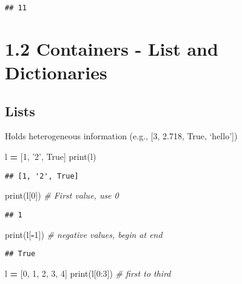 \documentclass[]{book}
\newenvironment{Shaded}{\begin{snugshade}}{\end{snugshade}}
\newcommand{\BuiltInTok}[1]{#1}
\newcommand{\CommentTok}[1]{\textcolor[rgb]{0.56,0.35,0.01}{\textit{#1}}}
\newcommand{\DecValTok}[1]{\textcolor[rgb]{0.00,0.00,0.81}{#1}}
\newcommand{\NormalTok}[1]{#1}
\newcommand{\OperatorTok}[1]{\textcolor[rgb]{0.81,0.36,0.00}{\textbf{#1}}}
\newcommand{\StringTok}[1]{\textcolor[rgb]{0.31,0.60,0.02}{#1}}
\newcommand{\VariableTok}[1]{\textcolor[rgb]{0.00,0.00,0.00}{#1}}
\theoremstyle{definition}
\theoremstyle{definition}
\theoremstyle{definition}
\theoremstyle{remark}
\begin{document}
\begin{verbatim}
## 11
\end{verbatim}

\hypertarget{containers---list-and-dictionaries}{%
\section{1.2 Containers - List and
Dictionaries}\label{containers---list-and-dictionaries}}

\hypertarget{lists}{%
\subsection{Lists}\label{lists}}

Holds heterogeneous information (e.g., {[}3, 2.718, True, `hello'{]})

\begin{Shaded}
\begin{Highlighting}[]
\NormalTok{l }\OperatorTok{=}\NormalTok{ [}\DecValTok{1}\NormalTok{, }\StringTok{'2'}\NormalTok{, }\VariableTok{True}\NormalTok{]}
\BuiltInTok{print}\NormalTok{(l)}
\end{Highlighting}
\end{Shaded}

\begin{verbatim}
## [1, '2', True]
\end{verbatim}

\begin{Shaded}
\begin{Highlighting}[]
\BuiltInTok{print}\NormalTok{(l[}\DecValTok{0}\NormalTok{]) }\CommentTok{# First value, use 0}
\end{Highlighting}
\end{Shaded}

\begin{verbatim}
## 1
\end{verbatim}

\begin{Shaded}
\begin{Highlighting}[]
\BuiltInTok{print}\NormalTok{(l[}\OperatorTok{-}\DecValTok{1}\NormalTok{]) }\CommentTok{# negative values, begin at end}
\end{Highlighting}
\end{Shaded}

\begin{verbatim}
## True
\end{verbatim}

\begin{Shaded}
\begin{Highlighting}[]
\NormalTok{l }\OperatorTok{=}\NormalTok{ [}\DecValTok{0}\NormalTok{, }\DecValTok{1}\NormalTok{, }\DecValTok{2}\NormalTok{, }\DecValTok{3}\NormalTok{, }\DecValTok{4}\NormalTok{]}
\BuiltInTok{print}\NormalTok{(l[}\DecValTok{0}\NormalTok{:}\DecValTok{3}\NormalTok{]) }\CommentTok{# first to third}
\end{Highlighting}
\end{Shaded}
\end{document}
